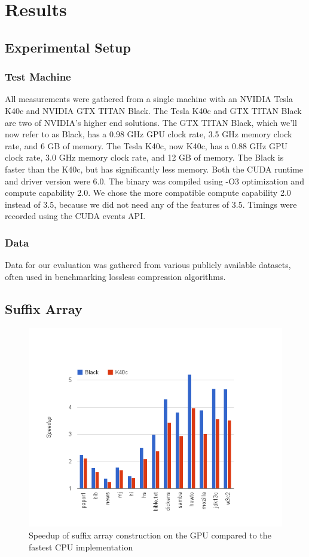 \chapter{Results}
\label{chap:results}

\section{Experimental Setup}
\subsection{Test Machine}
All measurements were gathered from a single machine with an NVIDIA Tesla K40c and NVIDIA GTX TITAN Black.
The Tesla K40c and GTX TITAN Black are two of NVIDIA's higher end solutions.
The GTX TITAN Black, which we'll now refer to as Black, has a 0.98 GHz GPU clock rate, 3.5 GHz memory clock rate, and 6 GB of memory.
The Tesla K40c, now K40c, has a 0.88 GHz GPU clock rate, 3.0 GHz memory clock rate, and 12 GB of memory.
The Black is faster than the K40c, but has significantly less memory.
Both the CUDA runtime and driver version were 6.0.
The binary was compiled using -O3 optimization and compute capability 2.0.
We chose the more compatible compute capability 2.0 instead of 3.5, because we did not need any of the features of 3.5.
Timings were recorded using the CUDA events API.

\subsection{Data}

Data for our evaluation was gathered from various publicly available datasets, often used in benchmarking lossless compression algorithms.

\section{Suffix Array}

\begin{figure}[ht!]
\centering
\includegraphics[width=1.0\textwidth]{images/saresult.png}
\caption{Speedup of suffix array construction on the GPU compared to the fastest CPU implementation}
\label{fig:saresult}
\end{figure}

